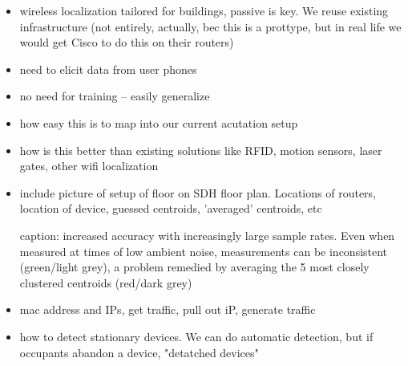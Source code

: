 \begin{itemize}
\item wireless localization tailored for buildings, passive is key. We reuse existing infrastructure (not entirely, actually, bec this is a prottype, but in real life we would get Cisco to do this on their routers)

\item need to elicit data from user phones

\item no need for training -- easily generalize

\item how easy this is to map into our current acutation setup

\item how is this better than existing solutions like RFID, motion sensors, laser gates, other wifi localization

\item include picture of setup of floor on SDH floor plan. Locations of routers, location of device, guessed centroids, 'averaged' centroids, etc

caption: increased accuracy with increasingly large sample rates. Even when measured at times of low ambient noise, measurements can be inconsistent (green/light grey), a problem remedied by averaging the 5 most closely clustered centroids (red/dark grey)

\item mac address and IPs, get traffic, pull out iP, generate traffic

\item how to detect stationary devices. We can do automatic detection, but if occupants abandon a device,  "detatched devices"

\end{itemize}
